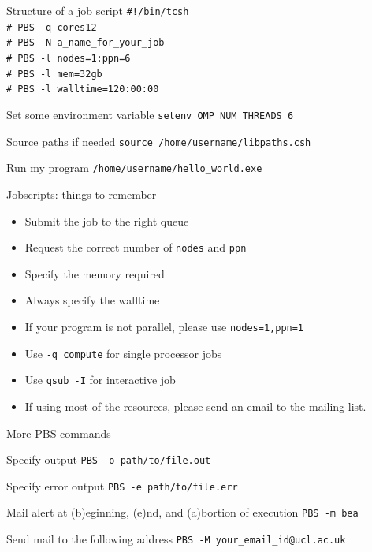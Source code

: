 \documentclass{beamer}
\begin{document}
\begin{frame}[fragile]{Structure of a job script}
	\texttt{\#!/bin/tcsh \\
	\# PBS -q cores12 \\
	\# PBS -N a\_name\_for\_your\_job \\
	\# PBS -l nodes=1:ppn=6 \\
	\# PBS -l mem=32gb \\
	\# PBS -l walltime=120:00:00} \\
	
	\begin{block}{Set some environment variable}
	    \texttt{setenv OMP\_NUM\_THREADS 6}
        \end{block}
	\begin{block}{Source paths if needed}
	    \texttt{source /home/username/libpaths.csh}
        \end{block}
	\begin{block}{Run my program}
	    \texttt{/home/username/hello\_world.exe}
        \end{block}	
\end{frame}

\begin{frame}{Jobscripts: things to remember}
	\begin{itemize}
		\item Submit the job to the right queue
		\item Request the correct number of \texttt{nodes} and \texttt{ppn}
		\item Specify the memory required
		\item Always specify the walltime
		\item If your program is not parallel, please use \texttt{nodes=1,ppn=1}
		\item Use \texttt{-q compute} for single processor jobs
		\item Use \texttt{qsub -I} for interactive job
		\item If using most of the resources, please send an email to the mailing list.
	\end{itemize}
\end{frame}

\begin{frame}[fragile]{More PBS commands}
	\begin{block}{Specify output}
	    \texttt{PBS -o path/to/file.out}
        \end{block}
	\begin{block}{Specify error output}
	    \texttt{PBS -e path/to/file.err}
        \end{block}
	\begin{block}{Mail alert at (b)eginning, (e)nd, and (a)bortion of execution}
	    \texttt{PBS -m bea}
        \end{block}
	\begin{block}{Send mail to the following address}
	    \texttt{PBS -M your\_email\_id@ucl.ac.uk}
        \end{block}                        
\end{frame}
\end{document}
